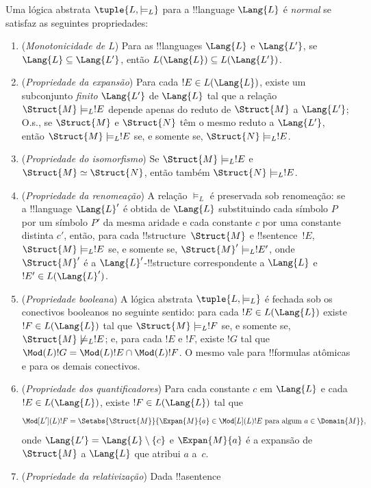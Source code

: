 \documentclass[../../../include/open-logic-section]{subfiles}
\begin{document}
\begin{defn}
Uma lógica abstrata $\tuple{L,\models_L}$ para a !!{language}
$\Lang{L}$ é \emph{normal} se satisfaz as seguintes propriedades:
\begin{enumerate}
\item (\emph{Monotonicidade de $L$}) Para as !!{language}s $\Lang{L}$
  e $\Lang{L'}$, se $\Lang{L} \subseteq \Lang{L'}$, então
  $L(\Lang{L}) \subseteq L(\Lang{L'})$.
\item (\emph{Propriedade da expansão}) Para cada $!E \in L(\Lang{L})$,
  existe um subconjunto \emph{finito} $\Lang{L'}$ de $\Lang{L}$ tal
  que a relação $\Struct{M} \models_L !E$ depende apenas do reduto de
  $\Struct{M}$ a $\Lang{L'}$; O.s.\@, se $\Struct{M}$ e $\Struct{N}$
  têm o mesmo reduto a $\Lang{L'}$, então
  $\Struct{M} \models_L !E$ se, e somente se,
  $\Struct{N} \models_L !E$.
\item (\emph{Propriedade do isomorfismo}) Se
  $\Struct{M} \models_L !E$ e $\Struct{M} \simeq \Struct{N}$, então
  também $\Struct{N} \models_L !E$.
\item (\emph{Propriedade da renomeação}) A relação $\models_L$ é
  preservada sob renomeação: se a !!{language} $\Lang{L}'$ é obtida de
  $\Lang{L}$ substituindo cada símbolo $P$ por um símbolo $P'$ da mesma
  aridade e cada constante $c$ por uma constante distinta $c'$, então,
  para cada !!{structure}~$\Struct{M}$ e !!{sentence}~$!E$,
  $\Struct{M} \models_L !E$ se, e somente se,
  $\Struct{M}' \models_L !E'$, onde $\Struct{M}'$ é a
  $\Lang{L}'$-!!{structure} correspondente a $\Lang{L}$ e
  $!E' \in L(\Lang{L}')$.
\item (\emph{Propriedade booleana}) A lógica abstrata
  $\tuple{L, \models_L}$ é fechada sob os conectivos booleanos no
  seguinte sentido: para cada $!E \in L(\Lang{L})$ existe
  $!F \in L(\Lang{L})$ tal que $\Struct{M} \models_L !F$ se, e somente
  se, $\Struct{M} \not\models_L !E$; e, para cada $!E$ e $!F$, existe
  $!G$ tal que $\Mod(L){!G} = \Mod(L){!E} \cap \Mod(L){!F}$. O mesmo
  vale para !!{formula}s atômicas e para os demais conectivos.
\item (\emph{Propriedade dos quantificadores}) Para cada constante $c$
  em $\Lang{L}$ e cada $!E \in L(\Lang{L})$, existe
  $!F \in L(\Lang{L})$ tal que
  \[
  \Mod[L'](L){!F} = \Setabs{\Struct{M}}{\Expan{M}{a} \in
  \Mod[L](L){!E} \text{ para algum } a \in \Domain{M}},
  \]
  onde $\Lang{L'} = \Lang{L} \setminus \{c\}$ e $\Expan{M}{a}$ é a
  expansão de $\Struct{M}$ a $\Lang{L}$ que atribui $a$ a~$c$.
\item (\emph{Propriedade da relativização}) Dada !!a{sentence}

\end{enumerate}
\end{defn}
\end{document}
